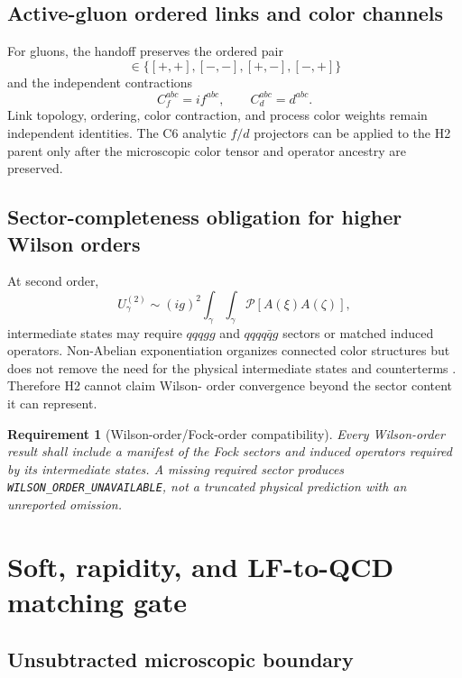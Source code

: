 \documentclass[11pt]{article}
\newtheorem{requirement}[definition]{Requirement}
\newcommand{\cP}{\mathcal P}
\begin{document}
\subsection{Active-gluon ordered links and color channels}

For gluons, the handoff preserves the ordered pair
\begin{equation}
 [U,U']\in
 \{[+,+],[-,-],[+,-],[-,+]\}
\end{equation}
and the independent contractions
\begin{equation}
 C_f^{abc}=if^{abc},
 \qquad
 C_d^{abc}=d^{abc}.
\end{equation}
Link topology, ordering, color contraction, and process color weights remain
independent identities.  The C6 analytic \(f/d\) projectors can be applied to
the H2 parent only after the microscopic color tensor and operator ancestry are
preserved.

\subsection{Sector-completeness obligation for higher Wilson orders}

At second order,
\begin{equation}
 U_\gamma^{(2)}
 \sim
 (ig)^2\int_\gamma\int_\gamma
 \cP[A(\xi)A(\zeta)],
\end{equation}
intermediate states may require \(qqqgg\) and \(qqqq\bar q g\) sectors or
matched induced operators.  Non-Abelian exponentiation organizes connected
color structures but does not remove the need for the physical intermediate
states and counterterms \cite{Gardi2013}.  Therefore H2 cannot claim Wilson-
order convergence beyond the sector content it can represent.

\begin{requirement}[Wilson-order/Fock-order compatibility]
Every Wilson-order result shall include a manifest of the Fock sectors and
induced operators required by its intermediate states.  A missing required
sector produces \texttt{WILSON\_ORDER\_UNAVAILABLE}, not a truncated physical
prediction with an unreported omission.
\end{requirement}

\section{Soft, rapidity, and LF-to-QCD matching gate}

\subsection{Unsubtracted microscopic boundary}
\end{document}
